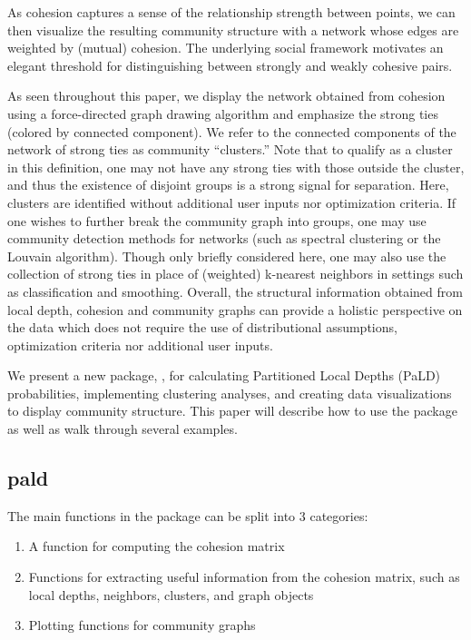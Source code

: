 As cohesion captures a sense of the relationship strength between
points, we can then visualize the resulting community structure with a
network whose edges are weighted by (mutual) cohesion. The underlying
social framework motivates an elegant threshold for distinguishing
between strongly and weakly cohesive pairs.

As seen throughout this paper, we display the network obtained from
cohesion using a force-directed graph drawing algorithm and emphasize
the strong ties (colored by connected component). We refer to the
connected components of the network of strong ties as community
``clusters.'' Note that to qualify as a cluster in this definition, one
may not have any strong ties with those outside the cluster, and thus
the existence of disjoint groups is a strong signal for separation.
Here, clusters are identified without additional user inputs nor
optimization criteria. If one wishes to further break the community
graph into groups, one may use community detection methods for networks
(such as spectral clustering or the Louvain algorithm). Though only
briefly considered here, one may also use the collection of strong ties
in place of (weighted) k-nearest neighbors in settings such as
classification and smoothing. Overall, the structural information
obtained from local depth, cohesion and community graphs can provide a
holistic perspective on the data which does not require the use of
distributional assumptions, optimization criteria nor additional user
inputs.

We present a new package, , for calculating Partitioned
Local Depths (PaLD) probabilities, implementing clustering analyses, and
creating data visualizations to display community structure. This paper
will describe how to use the package as well as walk through several
examples.

\hypertarget{pald}{%
\subsection{pald}\label{pald}}

The main functions in the  package can be split into 3
categories:

\begin{enumerate}
\def\labelenumi{\arabic{enumi}.}
\tightlist
\item
  A function for computing the cohesion matrix
\item
  Functions for extracting useful information from the cohesion matrix,
  such as local depths, neighbors, clusters, and graph objects
\item
  Plotting functions for community graphs
\end{enumerate}

